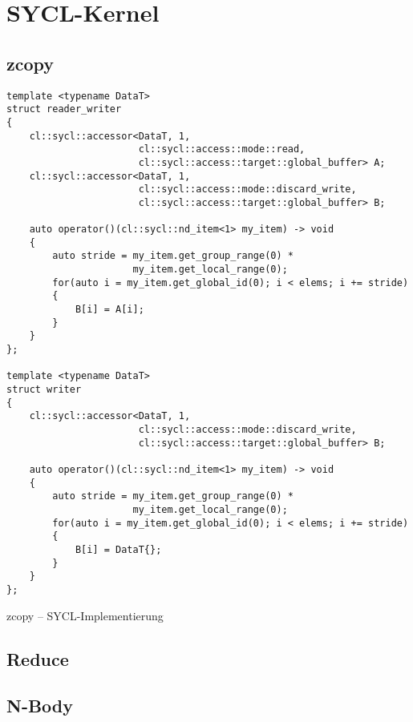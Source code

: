 \section{SYCL-Kernel}

\subsection{zcopy}

\begin{code}
    \begin{verbatim}
template <typename DataT>
struct reader_writer
{
    cl::sycl::accessor<DataT, 1,
                       cl::sycl::access::mode::read,
                       cl::sycl::access::target::global_buffer> A;
    cl::sycl::accessor<DataT, 1,
                       cl::sycl::access::mode::discard_write,
                       cl::sycl::access::target::global_buffer> B;

    auto operator()(cl::sycl::nd_item<1> my_item) -> void
    {
        auto stride = my_item.get_group_range(0) *
                      my_item.get_local_range(0);
        for(auto i = my_item.get_global_id(0); i < elems; i += stride)
        {
            B[i] = A[i];
        }
    }
};

template <typename DataT>
struct writer
{
    cl::sycl::accessor<DataT, 1,
                       cl::sycl::access::mode::discard_write,
                       cl::sycl::access::target::global_buffer> B;

    auto operator()(cl::sycl::nd_item<1> my_item) -> void
    {
        auto stride = my_item.get_group_range(0) *
                      my_item.get_local_range(0);
        for(auto i = my_item.get_global_id(0); i < elems; i += stride)
        {
            B[i] = DataT{};
        }
    }
};
    \end{verbatim}
    \caption{zcopy -- SYCL-Implementierung}
    \label{anhang:sycl:zcopy}
\end{code}

\subsection{Reduce}
\subsection{N-Body}
